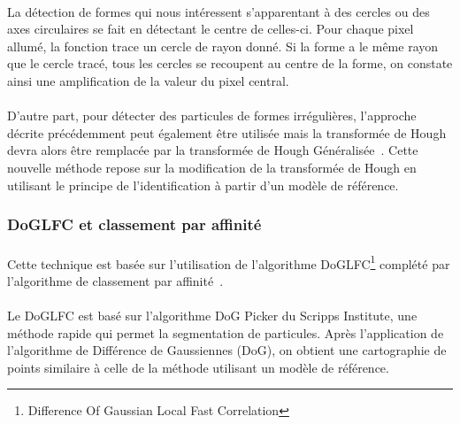 \paragraph*{}
La détection de formes qui nous intéressent s’apparentant à des cercles ou des axes circulaires se fait en détectant le centre de celles-ci.
Pour chaque pixel allumé, la fonction trace un cercle de rayon donné. Si la forme a le même rayon que le cercle tracé, tous les cercles se recoupent au centre de la forme, on constate ainsi une amplification de la valeur du pixel central.

\paragraph*{}
D'autre part, pour détecter des particules de formes irrégulières, l'approche décrite précédemment peut également \^etre utilisée mais la transformée de Hough devra alors \^etre remplacée par la transformée de Hough Généralisée~\cite{GHT:url}.
Cette nouvelle méthode repose sur la modification de la transformée de Hough en utilisant le principe de l'identification à partir d'un modèle de référence.

\subsubsection{DoGLFC et classement par affinité}

\paragraph*{}
Cette technique est basée sur l'utilisation de l'algorithme DoGLFC\footnote{Difference Of Gaussian Local Fast Correlation} complété par l'algorithme de classement par affinité~\cite{DoGAff:article}.

\paragraph*{}
Le DoGLFC est basé sur l'algorithme DoG Picker du Scripps Institute\cite{Scripps:url}, une méthode rapide qui permet la segmentation de particules. Après l'application de l'algorithme de Différence de Gaussiennes (DoG), on obtient une cartographie de points similaire à celle de la méthode utilisant un modèle de référence.%

